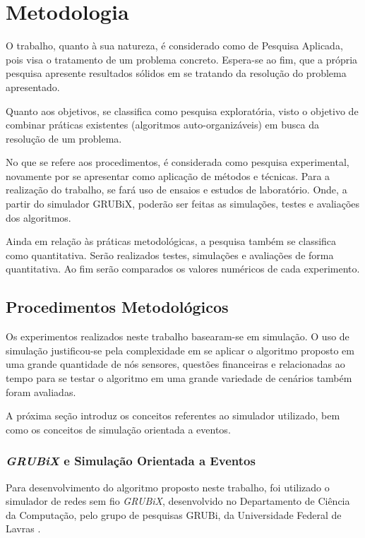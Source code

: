 \newpage\section{Metodologia}
\label{chap:Metodologia}


O trabalho, quanto à sua natureza, é considerado como de Pesquisa Aplicada, pois visa o tratamento de um problema concreto. Espera-se ao fim, que a própria pesquisa apresente resultados sólidos em se tratando da resolução do problema apresentado.

Quanto aos objetivos, se classifica como pesquisa exploratória, visto o objetivo de combinar práticas existentes (algoritmos auto-organizáveis) em busca da resolução de um problema.

No que se refere aos procedimentos, é considerada como pesquisa experimental, novamente por se apresentar como aplicação de métodos e técnicas. Para a realização do trabalho, se fará uso de ensaios e estudos de laboratório. Onde, a partir do simulador GRUBiX, poderão ser feitas as simulações, testes e avaliações dos algoritmos.
              
Ainda em relação às práticas metodológicas, a pesquisa também se classifica como quantitativa. Serão realizados testes, simulações e avaliações de forma quantitativa. Ao fim serão comparados os valores numéricos de cada experimento.

\subsection{Procedimentos Metodológicos}

Os experimentos realizados neste trabalho basearam-se em simulação. O uso de simulação justificou-se pela complexidade em se aplicar o algoritmo proposto em uma grande quantidade de nós sensores, questões financeiras e relacionadas ao tempo para se testar o algoritmo em uma grande variedade de cenários também foram avaliadas.

A próxima seção introduz os conceitos referentes ao simulador utilizado, bem como os conceitos de simulação orientada a eventos.

\subsubsection{\emph{GRUBiX} e Simulação Orientada a Eventos}
Para desenvolvimento do algoritmo proposto neste trabalho, foi utilizado o simulador de redes sem fio \emph{GRUBiX}, desenvolvido no Departamento de Ciência da Computação, pelo grupo de pesquisas GRUBi, da Universidade Federal de Lavras \cite{grubi}.

